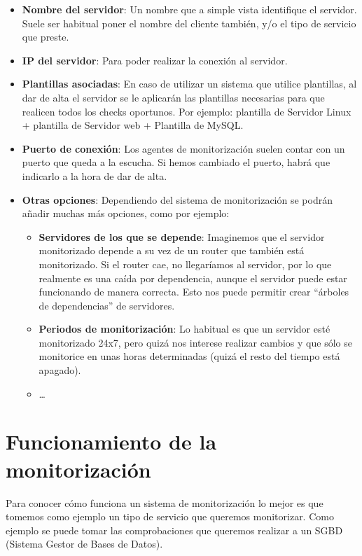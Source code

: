 \begin{itemize}
    \begin{itemize}
        \item \textbf{Nombre del servidor}: Un nombre que a simple vista identifique el servidor. Suele ser habitual poner el nombre del cliente también, y/o el tipo de servicio que preste.
        \item \textbf{IP del servidor}: Para poder realizar la conexión al servidor.
        \item \textbf{Plantillas asociadas}: En caso de utilizar un sistema que utilice plantillas, al dar de alta el servidor se le aplicarán las plantillas necesarias para que realicen todos los checks oportunos. Por ejemplo: plantilla de Servidor Linux + plantilla de Servidor web + Plantilla de MySQL.
        \item \textbf{Puerto de conexión}:  Los agentes de monitorización suelen contar con un puerto que queda a la escucha. Si hemos cambiado el puerto, habrá que indicarlo a la hora de dar de alta.
        \item \textbf{Otras opciones}: Dependiendo del sistema de monitorización se podrán añadir muchas más opciones, como por ejemplo:
        \begin{itemize}
            \item \textbf{Servidores de los que se depende}: Imaginemos que el servidor monitorizado depende a su vez de un router que también está monitorizado. Si el router cae, no llegaríamos al servidor, por lo que realmente es una caída por dependencia, aunque el servidor puede estar funcionando de manera correcta. Esto nos puede permitir crear “árboles de dependencias” de servidores.
            \item \textbf{Periodos de monitorización}: Lo habitual es que un servidor esté monitorizado 24x7, pero quizá nos interese realizar cambios y que sólo se monitorice en unas horas determinadas (quizá el resto del tiempo está apagado).
            \item …
        \end{itemize}
    \end{itemize}
\end{itemize}

\section{Funcionamiento de la monitorización}
Para conocer cómo funciona un sistema de monitorización lo mejor es que tomemos como ejemplo un tipo de servicio que queremos monitorizar. Como ejemplo se puede tomar las comprobaciones que queremos realizar a un SGBD (Sistema Gestor de Bases de Datos).


